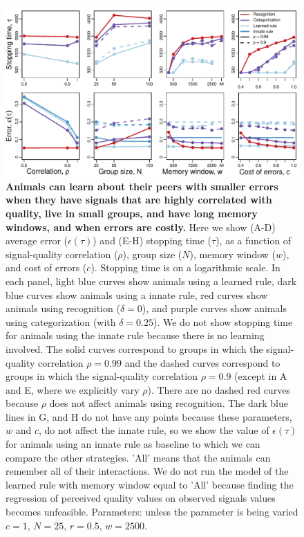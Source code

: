 \begin{figure}
\includegraphics[width=6.85in]{figures/parameters_exploration.pdf}
\caption{\sffamily\small\textbf{Animals can learn about their peers with smaller errors when they have signals that are highly correlated with quality, live in small groups, and have long memory windows, and when errors are costly.} Here we show (A-D) average error ($\epsilon(\tau)$) and (E-H) stopping time ($\tau$), as a function of signal-quality correlation ($\rho$), group size ($N$), memory window ($w$), and cost of errors ($c$). Stopping time is on a logarithmic scale. In each panel, light blue curves show animals using a learned rule, dark blue curves show animals using a innate rule, red curves show animals using recognition ($\delta=0$), and purple curves show animals using categorization (with $\delta=0.25$). We do not show stopping time for animals using the innate rule because there is no learning involved.  The solid curves correspond to groups in which the signal-quality correlation $\rho=0.99$ and the dashed curves correspond to groups in which the signal-quality correlation $\rho=0.9$ (except in A and E, where we explicitly vary $\rho$). There are no dashed red curves because $\rho$ does not affect animals using recognition. The dark blue lines in G, and H do not have any points because these parameters, $w$ and $c$, do not affect the innate rule, so we show the value of $\epsilon(\tau)$ for animals using an innate rule as baseline to which we can compare the other strategies. 'All' means that the animals can remember all of their interactions. We do not run the model of the learned rule with memory window equal to 'All' because finding the regression of perceived quality values on observed signals values becomes unfeasible. Parameters: unless the parameter is being varied $c=1$, $N=25$, $r=0.5$, $w=2500$.}
\label{parameters}
\end{figure}

